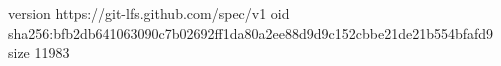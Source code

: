 version https://git-lfs.github.com/spec/v1
oid sha256:bfb2db641063090c7b02692ff1da80a2ee88d9d9c152cbbe21de21b554bfafd9
size 11983
